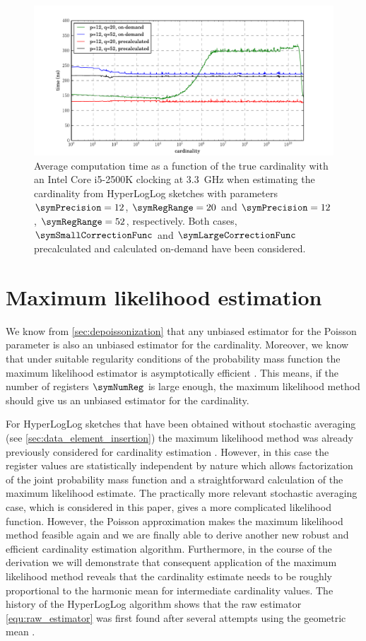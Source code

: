 \documentclass[a4paper]{scrartcl}
\begin{document}
\begin{figure}
\centering
\includegraphics[width=1\textwidth]{corrected_raw_avg_exec_time}
\caption{Average computation time as a function of the true cardinality with an Intel Core i5-2500K clocking at \SI{3.3}{\giga\hertz} when estimating the cardinality from HyperLogLog sketches with parameters $\symPrecision=12$, $\symRegRange=20$ and $\symPrecision=12$, $\symRegRange=52$, respectively. Both cases, $\symSmallCorrectionFunc$ and $\symLargeCorrectionFunc$ precalculated and calculated on-demand have been considered.}
\label{fig:corrected_raw_avg_exec_time}
\end{figure}

\section{Maximum likelihood estimation}
We know from \cref{sec:depoissonization} that any unbiased estimator for the Poisson parameter is also an unbiased estimator for the cardinality. Moreover, we know that under suitable regularity conditions of the probability mass function the maximum likelihood estimator is asymptotically efficient \cite{Casella2002}. This means, if the number of registers $\symNumReg$ is large enough, the maximum likelihood method should give us an unbiased estimator for the cardinality.

For HyperLogLog sketches that have been obtained without stochastic averaging (see \cref{sec:data_element_insertion}) the maximum likelihood method was already previously considered for cardinality estimation \cite{Clifford2012}. However, in this case the register values are statistically independent by nature which 
allows factorization of the joint probability mass function and a straightforward calculation of the maximum likelihood estimate. The practically more relevant stochastic averaging case, which is considered in this paper, gives a more complicated likelihood function. However, the Poisson approximation makes the maximum likelihood method feasible again and we are finally able to derive another new robust and efficient cardinality estimation algorithm. Furthermore, in the course of the derivation we will demonstrate that consequent application of the maximum likelihood method reveals that the cardinality estimate needs to be roughly proportional to the harmonic mean for intermediate cardinality values. The history of the HyperLogLog algorithm shows that the raw estimator \eqref{equ:raw_estimator} was first found after several attempts using the geometric mean \cite{Flajolet2007, Durand2003}.
\end{document}

